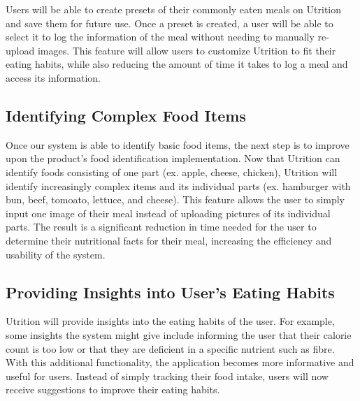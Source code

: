 \documentclass{article}
\begin{document}
Users will be able to create presets of their commonly eaten meals on Utrition 
and save them for future use. Once a preset is created, a user will be able to 
select it to log the information of the meal without needing to manually 
re-upload images. This feature will allow users to customize Utrition to fit 
their eating habits, while also reducing the amount of time it takes to log a 
meal and access its information.

\subsection{Identifying Complex Food Items}

Once our system is able to identify basic food items, the next step is to improve upon the product's food identification implementation. Now that Utrition can identify foods consisting of one part (ex. apple, cheese, chicken), Utrition will identify increasingly complex items and its individual parts (ex. hamburger with bun, beef, tomoato, lettuce, and cheese). This feature allows the user to simply input one image of their meal instead of uploading pictures of its individual parts. The result is a significant reduction in time needed for the user to determine their nutritional facts for their meal, increasing the efficiency and usability of the system.

\subsection{Providing Insights into User's Eating Habits}

Utrition will provide insights into the eating habits of the user. For example, some insights the system might give include informing the user that their calorie count is too low or that they are deficient in a specific nutrient such as fibre. With this additional functionality, the application becomes more informative and useful for users. Instead of simply tracking their food intake, users will now receive suggestions to improve their eating habits.
\end{document}

